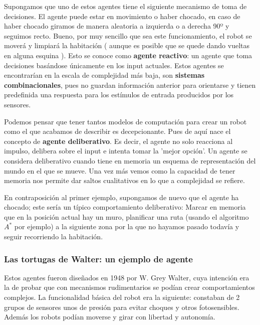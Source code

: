 \vspace{10px}

Supongamos que uno de estos agentes tiene el siguiente mecanismo de toma de decisiones. El agente puede estar en movimiento o haber chocado, en caso de haber chocado giramos de manera aleatoria a izquierda o a derecha 90º y seguimos recto. Bueno, por muy sencillo que sea este funcionamiento, el robot se moverá y limpiará la habitación ( aunque es posible que se quede dando vueltas en alguna esquina ). Esto se conoce como \textbf{agente reactivo}: un agente que toma decisiones basándose únicamente en los input actuales. Estos agentes se encontrarían en la escala de complejidad más baja, son \textbf{sistemas combinacionales}, pues no guardan información anterior para orientarse y tienen predefinida una respuesta para los estímulos de entrada producidos por los sensores.


\vspace{10px}

Podemos pensar que tener tantos modelos de computación para crear un robot como el que acabamos de describir es decepcionante. Pues de aquí nace el concepto de \textbf{agente deliberativo}. Es decir, el agente no solo reacciona al impulso, delibera sobre el input e intenta tomar la 'mejor opción'. Un agente se considera deliberativo cuando tiene en memoria un esquema de representación del mundo en el que se mueve. Una vez más vemos como la capacidad de tener memoria nos permite dar saltos cualitativos en lo que a complejidad se refiere.

\vspace{10px}

En contraposición al primer ejemplo, supongamos de nuevo que el agente ha chocado; este sería un típico comportamiento deliberativo: Marcar en memoria que en la posición actual hay un muro, planificar una ruta (usando el algoritmo $A^*$ por ejemplo) a la siguiente zona por la que no hayamos pasado todavía y seguir recorriendo la habitación.

\subsubsection{Las tortugas de Walter: un ejemplo de agente}

Estos agentes fueron diseñados en 1948 por W. Grey Walter, cuya intención era la de probar que con mecanismos rudimentarios se podían crear comportamientos complejos. La funcionalidad básica del robot era la siguiente: constaban de 2 grupos de sensores unos de presión para evitar choques y otros fotosensibles. Además los robots podían moverse y girar con libertad y autonomía.

